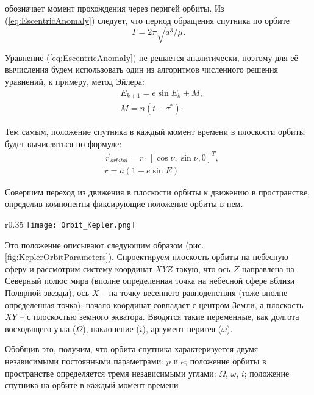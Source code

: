 обозначает момент прохождения через перигей орбиты. Из (\ref{eq:EscentricAnomaly})
следует, что период обращения спутника по орбите
\begin{equation}
  T = 2\pi\sqrt{a^3/\mu}.
\end{equation}\par
Уравнение (\ref{eq:EscentricAnomaly}) не решается аналитически, поэтому для её
вычисления будем использовать один из алгоритмов численного решения уравнений, к примеру,
метод Эйлера:
\begin{equation}
  \begin{aligned}
    & E_{k+1} = e\sin E_k + M, \\
    & M = n(t - \tau^*).
  \end{aligned}
\end{equation}\par
Тем самым, положение спутника в каждый момент времени в плоскости орбиты
будет вычисляться по формуле:
\begin{equation}
  \begin{aligned}
    & \vec{r}_{orbital} = r \cdot [\cos\nu, \sin\nu, 0]^{T}, \\
    & r = a(1 - e\sin E)
  \end{aligned}
\end{equation}\par
Совершим переход из движения в плоскости орбиты к движению в пространстве, определив
компоненты фиксирующие положение орбиты в нем.
\begin{wrapfigure}{r}{0.35\textwidth}
  \texttt{[image: Orbit\_Kepler.png]}
  \caption{Кеплеровы элементы}
  \label{fig:KeplerOrbitParameters}
\end{wrapfigure}
Это положение описывают следующим образом (рис. \ref{fig:KeplerOrbitParameters}).
Спроектируем плоскость орбиты на небесную сферу и рассмотрим систему координат $XYZ$
такую, что ось $Z$ направлена на Северный полюс мира (вполне определенная точка
на небесной сфере вблизи Полярной звезды), ось $X$ -- на точку весеннего
равноденствия (тоже вполне определенная точка); начало координат совпадает с
центром Земли, а плоскость $XY$ -- с плоскостью земного экватора.
Вводятся такие переменные, как долгота восходящего узла ($\Omega$), наклонение ($i$),
аргумент перигея ($\omega$).\par
Обобщив это, получим, что орбита спутника характеризуется двумя независимыми постоянными
параметрами: $p$ и $e$; положение орбиты в пространстве определяется тремя независимыми
углами: $\Omega$, $\omega$, $i$; положение спутника на орбите в каждый момент времени
